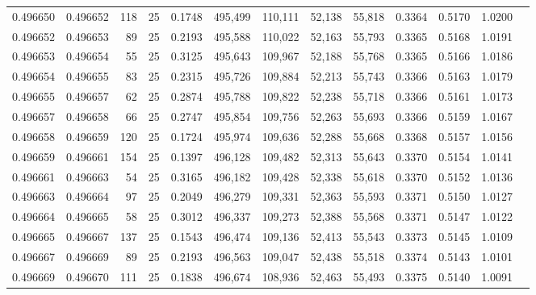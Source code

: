 \begin{tabular}{rrrrrrrrrrrrr}
0.496650 & 0.496652 &   118 &  25 &                                     0.1748 & 495,499 & 110,111 &  52,138 &  55,818 & 0.3364 & 0.5170 & 1.0200 \\
0.496652 & 0.496653 &    89 &  25 &                                     0.2193 & 495,588 & 110,022 &  52,163 &  55,793 & 0.3365 & 0.5168 & 1.0191 \\
0.496653 & 0.496654 &    55 &  25 &                                     0.3125 & 495,643 & 109,967 &  52,188 &  55,768 & 0.3365 & 0.5166 & 1.0186 \\
0.496654 & 0.496655 &    83 &  25 &                                     0.2315 & 495,726 & 109,884 &  52,213 &  55,743 & 0.3366 & 0.5163 & 1.0179 \\
0.496655 & 0.496657 &    62 &  25 &                                     0.2874 & 495,788 & 109,822 &  52,238 &  55,718 & 0.3366 & 0.5161 & 1.0173 \\
0.496657 & 0.496658 &    66 &  25 &                                     0.2747 & 495,854 & 109,756 &  52,263 &  55,693 & 0.3366 & 0.5159 & 1.0167 \\
0.496658 & 0.496659 &   120 &  25 &                                     0.1724 & 495,974 & 109,636 &  52,288 &  55,668 & 0.3368 & 0.5157 & 1.0156 \\
0.496659 & 0.496661 &   154 &  25 &                                     0.1397 & 496,128 & 109,482 &  52,313 &  55,643 & 0.3370 & 0.5154 & 1.0141 \\
0.496661 & 0.496663 &    54 &  25 &                                     0.3165 & 496,182 & 109,428 &  52,338 &  55,618 & 0.3370 & 0.5152 & 1.0136 \\
0.496663 & 0.496664 &    97 &  25 &                                     0.2049 & 496,279 & 109,331 &  52,363 &  55,593 & 0.3371 & 0.5150 & 1.0127 \\
0.496664 & 0.496665 &    58 &  25 &                                     0.3012 & 496,337 & 109,273 &  52,388 &  55,568 & 0.3371 & 0.5147 & 1.0122 \\
0.496665 & 0.496667 &   137 &  25 &                                     0.1543 & 496,474 & 109,136 &  52,413 &  55,543 & 0.3373 & 0.5145 & 1.0109 \\
0.496667 & 0.496669 &    89 &  25 &                                     0.2193 & 496,563 & 109,047 &  52,438 &  55,518 & 0.3374 & 0.5143 & 1.0101 \\
0.496669 & 0.496670 &   111 &  25 &                                     0.1838 & 496,674 & 108,936 &  52,463 &  55,493 & 0.3375 & 0.5140 & 1.0091 \\

\end{tabular}
